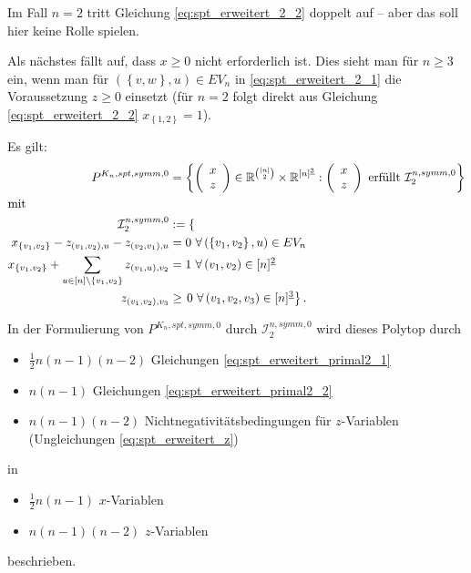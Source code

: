 \documentclass[10p,a4paper,BCOR = 12mm, DIV=15]{scrbook}
\begin{document}
\begin{Bem}
Im Fall $n=2$ tritt Gleichung \eqref{eq:spt_erweitert_2_2} doppelt auf -- aber das soll hier keine Rolle spielen.
\end{Bem}

Als nächstes fällt auf, dass $x\geq 0$ nicht erforderlich ist. Dies sieht man für $n\geq 3$ ein, wenn man für $\left(\left\{v, w\right\}, u\right)\in EV_n$ in \eqref{eq:spt_erweitert_2_1} die Voraussetzung $z\geq 0$ einsetzt (für $n=2$ folgt direkt aus Gleichung \eqref{eq:spt_erweitert_2_2} $x_{\left\{1, 2\right\}} = 1$).

\begin{Le}
\label{le:spt_erweitert_dual2}
Es gilt:
\begin{align}
P^{K_n, spt, symm, 0} & = \left\{
\left(\begin{array}{c}
x \\
z
\end{array}\right)\in\mathbb{R}^{[n]\choose 2}\times \mathbb{R}^{[n]^{\underline{3}}}: \left(\begin{array}{c}
x \\
z
\end{array}\right)\textnormal{ erfüllt }\mathcal{I}^{n, symm, 0}_2\right\} \nonumber \\
\shortintertext{mit}
\mathcal{I}^{n, symm, 0}_2 & := \left\{ \right. \nonumber \\
x_{\left\{v_1, v_2\right\}} - z_{\left(v_1, v_2\right), u} - z_{\left(v_2, v_1\right), u} & = 0\ \forall \left(\left\{v_1, v_2\right\}, u\right)\in EV_n \label{eq:spt_erweitert_primal2_1} \\
x_{\left\{v_1, v_2\right\}} + \sum_{u\in[n]\backslash\left\{v_1, v_2\right\}} z_{\left(v_1, u\right), v_2} & = 1\ \forall \left(v_1, v_2\right)\in [n]^{\underline{2}} \label{eq:spt_erweitert_primal2_2} \\
z_{\left(v_1, v_2\right), v_3} & \geq \left.0\ \forall \left(v_1, v_2, v_3\right)\in [n]^{\underline{3}} \right\}. \label{eq:spt_erweitert_z}
\end{align}
\end{Le}

\begin{Bem}
\label{bem:spt_erweitert_dual2}
In der Formulierung von $P^{K_n, spt, symm, 0}$ durch $\mathcal{I}^{n, symm, 0}_2$ wird dieses Polytop durch
\begin{itemize}
\item $\frac{1}{2} n \left(n-1\right) \left(n-2\right)$ Gleichungen \eqref{eq:spt_erweitert_primal2_1}
\item $n \left(n-1\right)$ Gleichungen \eqref{eq:spt_erweitert_primal2_2}
\item $n \left(n-1\right) \left(n-2\right)$ Nichtnegativitätsbedingungen für $z$-Variablen (Ungleichungen \eqref{eq:spt_erweitert_z})
\end{itemize}
in
\begin{itemize}
\item $\frac{1}{2} n \left(n-1\right)$ $x$-Variablen
\item $n \left(n-1\right) \left(n-2\right)$ $z$-Variablen
\end{itemize}
beschrieben.
\end{Bem}
\end{document}
